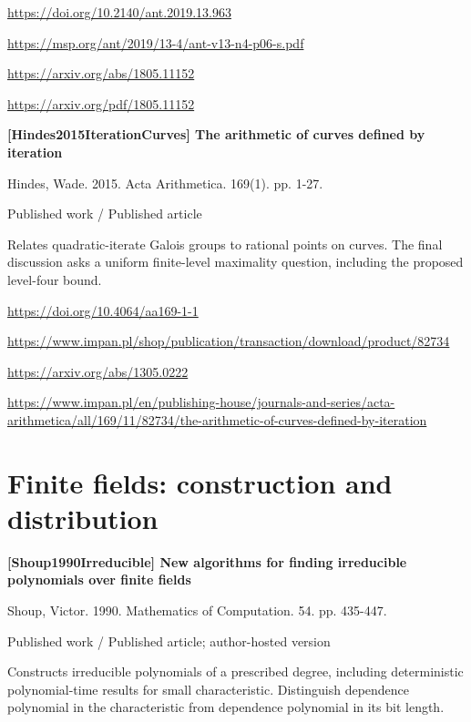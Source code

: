 \documentclass[11pt,a4paper,oneside,openany]{book}
\begin{document}
{\footnotesize\url{https://doi.org/10.2140/ant.2019.13.963}}\par
{\footnotesize\url{https://msp.org/ant/2019/13-4/ant-v13-n4-p06-s.pdf}}\par
{\footnotesize\url{https://arxiv.org/abs/1805.11152}}\par
{\footnotesize\url{https://arxiv.org/pdf/1805.11152}}\par
\vspace{9pt}
\hypertarget{ref:Hindes2015IterationCurves}{}
{\sffamily\bfseries\color{atlasgreen}[Hindes2015IterationCurves] The arithmetic of curves defined by iteration}\par
\color{black} Hindes, Wade. 2015. Acta Arithmetica. 169(1). pp. 1-27.\par
{\small\sffamily\color{atlasgold}Published work / Published article}\par
\color{black} Relates quadratic-iterate Galois groups to rational points on curves. The final discussion asks a uniform finite-level maximality question, including the proposed level-four bound.\par
{\footnotesize\url{https://doi.org/10.4064/aa169-1-1}}\par
{\footnotesize\url{https://www.impan.pl/shop/publication/transaction/download/product/82734}}\par
{\footnotesize\url{https://arxiv.org/abs/1305.0222}}\par
{\footnotesize\url{https://www.impan.pl/en/publishing-house/journals-and-series/acta-arithmetica/all/169/11/82734/the-arithmetic-of-curves-defined-by-iteration}}\par
\vspace{9pt}
\section{Finite fields: construction and distribution}
\hypertarget{ref:Shoup1990Irreducible}{}
{\sffamily\bfseries\color{atlasgreen}[Shoup1990Irreducible] New algorithms for finding irreducible polynomials over finite fields}\par
\color{black} Shoup, Victor. 1990. Mathematics of Computation. 54. pp. 435-447.\par
{\small\sffamily\color{atlasgold}Published work / Published article; author-hosted version}\par
\color{black} Constructs irreducible polynomials of a prescribed degree, including deterministic polynomial-time results for small characteristic. Distinguish dependence polynomial in the characteristic from dependence polynomial in its bit length.\par
\end{document}

